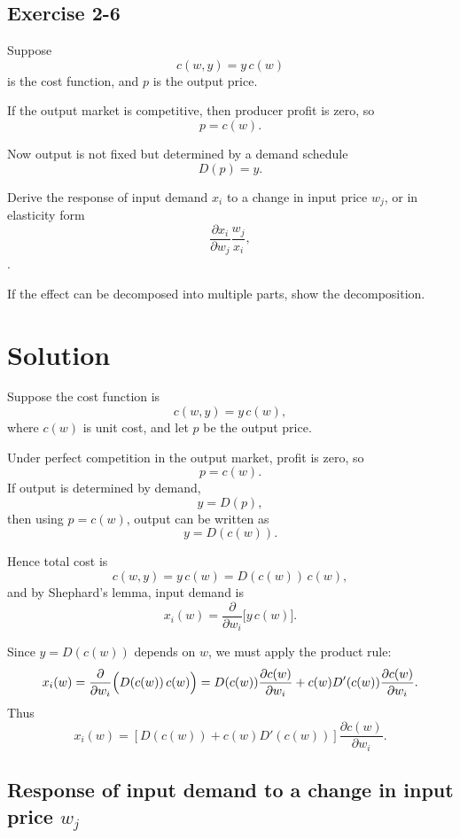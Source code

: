\vspace{30pt}
\begin{tcolorbox}[breakable]

\subsection*{Exercise 2-6}

Suppose
\[
c(w,y)=y\,c(w)
\]
is the cost function, and $p$ is the output price.

If the output market is competitive, then producer profit is zero, so
\[
p=c(w).
\]

Now output is not fixed but determined by a demand schedule
\[
D(p)=y.
\]

Derive the response of input demand $x_i$ to a change in input price $w_j$,
or in elasticity form
\[
\frac{\partial x_i}{\partial w_j} \frac{w_j}{x_i},
\].

If the effect can be decomposed into multiple parts, show the decomposition.

\end{tcolorbox}


\section*{Solution}

Suppose the cost function is
\[
c(w,y)=y\,c(w),
\]
where \(c(w)\) is unit cost, and let \(p\) be the output price.

Under perfect competition in the output market, profit is zero, so
\[
p=c(w).
\]
If output is determined by demand,
\[
y=D(p),
\]
then using \(p=c(w)\), output can be written as
\[
y=D(c(w)).
\]

Hence total cost is
\[
c(w,y)=y\,c(w)=D(c(w))\,c(w),
\]
and by Shephard's lemma, input demand is
\[
x_i(w)=\frac{\partial}{\partial w_i}\bigl[y\,c(w)\bigr].
\]

Since \(y=D(c(w))\) depends on \(w\), we must apply the product rule:
\[
x_i(w)
=
\frac{\partial}{\partial w_i}\Bigl(D(c(w))\,c(w)\Bigr)
=
D(c(w))\frac{\partial c(w)}{\partial w_i}
+
c(w)D'(c(w))\frac{\partial c(w)}{\partial w_i}.
\]
Thus
\[
x_i(w)
=
\left[D(c(w))+c(w)D'(c(w))\right]\frac{\partial c(w)}{\partial w_i}.
\]

\subsection*{Response of input demand to a change in input price \(w_j\)}

